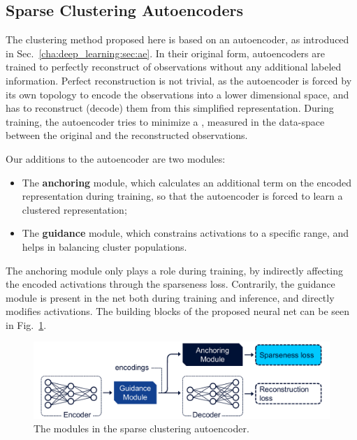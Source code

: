 		\subsection{Sparse Clustering Autoencoders}
			
			The clustering method proposed here is based on an autoencoder, as introduced in Sec.~\ref{cha:deep_learning:sec:ae}.
			In their original form, autoencoders are trained to perfectly reconstruct of observations without any additional labeled information.
			Perfect reconstruction is not trivial, as the autoencoder is forced by its own topology to encode the observations into a lower dimensional space, and has to reconstruct (decode) them from this simplified representation.
			During training, the autoencoder tries to minimize a , measured in the data-space between the original and the reconstructed observations.
			
			Our additions to the autoencoder are two modules:
			\begin{itemize}
				\item The \textbf{anchoring} module, which calculates an additional  term on the encoded representation during training, so that the autoencoder is forced to learn a clustered representation; 
				\item The \textbf{guidance} module, which constrains activations to a specific range, and helps in balancing cluster populations.
			\end{itemize}
			\noindent The anchoring module only plays a role during training, by indirectly affecting the encoded activations through the sparseness loss.
			Contrarily, the guidance module is present in the net both during training and inference, and directly modifies activations.
			The building blocks of the proposed neural net can be seen in Fig.~\ref{fig:sca_overview}.
			
			\begin{figure}[ht]
				\centering
				\includegraphics[width=\linewidth]{figures/06_sparse_clust/sca_overview/sca_overview.pdf}
				\caption[SCA modules]{The modules in the sparse clustering autoencoder.}
				\label{fig:sca_overview}
			\end{figure}
			
